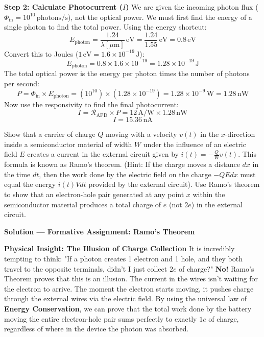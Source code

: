 \textbf{Step 2: Calculate Photocurrent ($I$)}
We are given the incoming photon flux ($\Phi_{\text{in}} = 10^{10}\,\text{photons/s}$), not the optical power. We must first find the energy of a single photon to find the total power. Using the energy shortcut:
\begin{equation*}
  E_{\text{photon}} = \frac{1.24}{\lambda[\mu\text{m}]}\,\text{eV} = \frac{1.24}{1.55}\,\text{eV} = 0.8\,\text{eV}
\end{equation*}
Convert this to Joules ($1\,\text{eV} = 1.6\times10^{-19}\,\text{J}$):
\begin{equation*}
  E_{\text{photon}} = 0.8 \times 1.6\times10^{-19} = 1.28\times10^{-19}\,\text{J}
\end{equation*}
The total optical power is the energy per photon times the number of photons per second:
\begin{equation*}
  P = \Phi_{\text{in}} \times E_{\text{photon}} = (10^{10}) \times (1.28\times10^{-19}) = 1.28\times10^{-9}\,\text{W} = 1.28\,\text{nW}
\end{equation*}
Now use the responsivity to find the final photocurrent:
\begin{equation*}
  I = \mathcal{R}_{\text{APD}} \times P = 12\,\text{A/W} \times 1.28\,\text{nW}
\end{equation*}
\begin{equation*}
  \boxed{I = 15.36\,\text{nA}}
\end{equation*}

\begin{question}
Show that a carrier of charge $Q$ moving with a velocity $v(t)$ in the $x$-direction inside a semiconductor material of width $W$ under the influence of an electric field $E$ creates a current in the external circuit given by $i(t) = -\frac{Q}{W} v(t)$. This formula is known as Ramo's theorem. (Hint: If the charge moves a distance $dx$ in the time $dt$, then the work done by the electric field on the charge $-QE dx$ must equal the energy $i(t) V dt$ provided by the external circuit). Use Ramo's theorem to show that an electron-hole pair generated at any point $x$ within the semiconductor material produces a total charge of $e$ (not $2e$) in the external circuit.
\end{question}

\textbf{\large Solution --- Formative Assignment: Ramo's Theorem}

\textbf{Physical Insight: The Illusion of Charge Collection}
It is incredibly tempting to think: "If a photon creates 1 electron and 1 hole, and they both travel to the opposite terminals, didn't I just collect $2e$ of charge?"
\textbf{No!} Ramo's Theorem proves that this is an illusion. The current in the wires isn't waiting for the electron to arrive. The moment the electron starts moving, it pushes charge through the external wires via the electric field. By using the universal law of \textbf{Energy Conservation}, we can prove that the total work done by the battery moving the entire electron-hole pair sums perfectly to exactly $1e$ of charge, regardless of where in the device the photon was absorbed.

